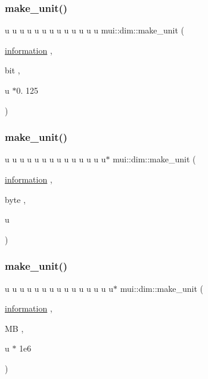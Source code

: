 \mbox{\label{namespacemui_1_1dim_a60f98618196effbc4cfa0a0e6a65878f}} 
\subsubsection{\texorpdfstring{make\+\_\+unit()}{make\_unit()}\hspace{0.1cm}{\footnotesize\ttfamily [14/32]}}
{\footnotesize\ttfamily u u u u u u u u u u u u u mui\+::dim\+::make\+\_\+unit (\begin{DoxyParamCaption}\item[{\hyperlink{namespacemui_1_1dim_abee516dc27b7ef30e706ffc9ce0ea363}{information}}]{,  }\item[{bit}]{,  }\item[{u $\ast$0.}]{125 }\end{DoxyParamCaption})}

\mbox{\label{namespacemui_1_1dim_ad948fccaa4d4572e517cf2b476c3a76f}} 
\subsubsection{\texorpdfstring{make\+\_\+unit()}{make\_unit()}\hspace{0.1cm}{\footnotesize\ttfamily [15/32]}}
{\footnotesize\ttfamily u u u u u u u u u u u u u u$\ast$ mui\+::dim\+::make\+\_\+unit (\begin{DoxyParamCaption}\item[{\hyperlink{namespacemui_1_1dim_abee516dc27b7ef30e706ffc9ce0ea363}{information}}]{,  }\item[{byte}]{,  }\item[{u}]{ }\end{DoxyParamCaption})}

\mbox{\label{namespacemui_1_1dim_ac2b7c3d91c325a48a4e6772719b3277d}} 
\subsubsection{\texorpdfstring{make\+\_\+unit()}{make\_unit()}\hspace{0.1cm}{\footnotesize\ttfamily [16/32]}}
{\footnotesize\ttfamily u u u u u u u u u u u u u u u$\ast$ mui\+::dim\+::make\+\_\+unit (\begin{DoxyParamCaption}\item[{\hyperlink{namespacemui_1_1dim_abee516dc27b7ef30e706ffc9ce0ea363}{information}}]{,  }\item[{MB}]{,  }\item[{u $\ast$}]{1e6 }\end{DoxyParamCaption})}

